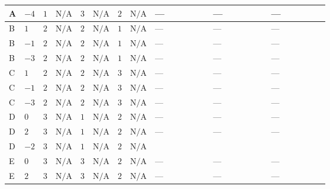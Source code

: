 \documentclass[8pt]{article}
\begin{document}
\begin{landscape}
\begin{longtable}{@{}llcccccc >{\raggedright\arraybackslash}p{0.21\linewidth} >{\raggedright\arraybackslash}p{0.21\linewidth} >{\raggedright\arraybackslash}p{0.21\linewidth}@{}}
\midrule
A & $-4$ & $1$ & $\text{N/A}$ & $3$ & $\text{N/A}$ & $2$ & $\text{N/A}$ & --- & --- & --- \\
\midrule
B & $1$ & $2$ & $\text{N/A}$ & $2$ & $\text{N/A}$ & $1$ & $\text{N/A}$ & --- & --- & --- \\
\midrule
B & $-1$ & $2$ & $\text{N/A}$ & $2$ & $\text{N/A}$ & $1$ & $\text{N/A}$ & --- & --- & --- \\
\midrule
B & $-3$ & $2$ & $\text{N/A}$ & $2$ & $\text{N/A}$ & $1$ & $\text{N/A}$ & --- & --- & --- \\
\midrule
C & $1$ & $2$ & $\text{N/A}$ & $2$ & $\text{N/A}$ & $3$ & $\text{N/A}$ & --- & --- & --- \\
\midrule
C & $-1$ & $2$ & $\text{N/A}$ & $2$ & $\text{N/A}$ & $3$ & $\text{N/A}$ & --- & --- & --- \\
\midrule
C & $-3$ & $2$ & $\text{N/A}$ & $2$ & $\text{N/A}$ & $3$ & $\text{N/A}$ & --- & --- & --- \\
\midrule
D & $0$ & $3$ & $\text{N/A}$ & $1$ & $\text{N/A}$ & $2$ & $\text{N/A}$ & --- & --- & --- \\
\midrule
D & $2$ & $3$ & $\text{N/A}$ & $1$ & $\text{N/A}$ & $2$ & $\text{N/A}$ & --- & --- & --- \\
\midrule
D & $-2$ & $3$ & $\text{N/A}$ & $1$ & $\text{N/A}$ & $2$ & $\text{N/A}$ & \scriptsize\adjustbox{max width=\linewidth}{$\begin{gathered} {\lambda_{X_{16}}} (6 \operatorname{Tr}\!\left({Y_d}\,\left({Y_d}\right)^{\dagger}\right)+2 \operatorname{Tr}\!\left({Y_e}\,\left({Y_e}\right)^{\dagger}\right)+6 \operatorname{Tr}\!\left({Y_u}\,\left({Y_u}\right)^{\dagger}\right))\end{gathered}$} & \scriptsize\adjustbox{max width=\linewidth}{$\begin{gathered} +24 {\lambda_{X_{1}}} \left({\lambda_{X_{16}}}\right)^{*}\end{gathered}$} & \scriptsize\adjustbox{max width=\linewidth}{$\begin{gathered} -\frac{9 {g_2}^2 {\lambda_{X_{16}}}}{2}\end{gathered}$} \\
\midrule
E & $0$ & $3$ & $\text{N/A}$ & $3$ & $\text{N/A}$ & $2$ & $\text{N/A}$ & --- & --- & --- \\
\midrule
E & $2$ & $3$ & $\text{N/A}$ & $3$ & $\text{N/A}$ & $2$ & $\text{N/A}$ & --- & --- & --- \\
\midrule

\end{longtable}
\end{landscape}
\end{document}
